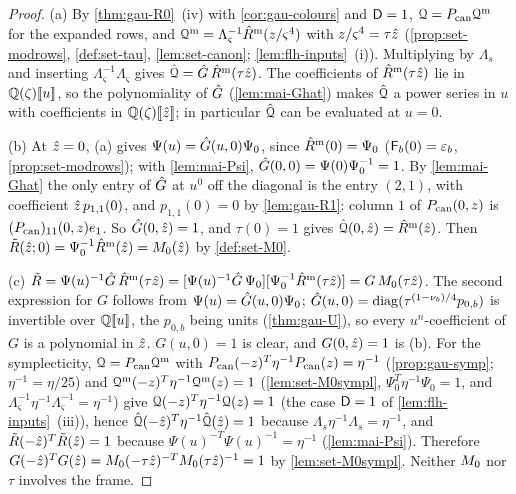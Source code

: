 \begin{proof}
(a) By \cref{thm:gau-R0}~(iv) with \cref{cor:gau-colours} and $\mathsf{D}=1$, $\mathcal{Q}=P_{\mathrm{can}}\mathcal{Q}^{\mathrm m}$ for the expanded rows, and $\mathcal{Q}^{\mathrm m}=\Lambda_\varsigma^{-1}\hat{R}^{\mathrm m}(z/\varsigma^4)$ with $z/\varsigma^4=\tau\hat{z}$ (\cref{prop:set-modrows}, \cref{def:set-tau}, \cref{lem:set-canon}; \cref{lem:flh-inputs}~(i)). Multiplying by $\Lambda_s$ and inserting $\Lambda_\varsigma^{-1}\Lambda_\varsigma$ gives $\hat{\mathcal{Q}}=\hat{G}\,\hat{R}^{\mathrm m}(\tau\hat{z})$. The coefficients of $\hat{R}^{\mathrm m}(\tau\hat{z})$ lie in $\mathbb{Q}(\zeta)[\![ u ]\!]$, so the polynomiality of $\hat{G}$ (\cref{lem:mai-Ghat}) makes $\hat{\mathcal{Q}}$ a power series in $u$ with coefficients in $\mathbb{Q}(\zeta)[\![ \hat{z} ]\!]$; in particular $\hat{\mathcal{Q}}$ can be evaluated at $u=0$.

(b) At $\hat{z}=0$, (a) gives $\Psi(u)=\hat{G}(u,0)\Psi_0$, since $\hat{R}^{\mathrm m}(0)=\Psi_0$ ($\mathsf{F}_b(0)=\varepsilon_b$, \cref{prop:set-modrows}); with \cref{lem:mai-Psi}, $\hat{G}(0,0)=\Psi(0)\Psi_0^{-1}=1$. By \cref{lem:mai-Ghat} the only entry of $\hat{G}$ at $u^0$ off the diagonal is the entry $(2,1)$, with coefficient $\hat{z}\,p_{1,1}(0)$, and $p_{1,1}(0)=0$ by \cref{lem:gau-R1}: column $1$ of $P_{\mathrm{can}}(0,z)$ is $(P_{\mathrm{can}})_{11}(0,z)e_1$. So $\hat{G}(0,\hat{z})=1$, and $\tau(0)=1$ gives $\hat{\mathcal{Q}}(0,\hat{z})=\hat{R}^{\mathrm m}(\hat{z})$. Then $\tilde R(\hat{z};0)=\Psi_0^{-1}\hat{R}^{\mathrm m}(\hat{z})=M_{0}(\hat{z})$ by \cref{def:set-M0}.

(c) $\tilde R=\Psi(u)^{-1}\hat{G}\,\hat{R}^{\mathrm m}(\tau\hat{z})=[\Psi(u)^{-1}\hat{G}\,\Psi_0][\Psi_0^{-1}\hat{R}^{\mathrm m}(\tau\hat{z})]=G\,M_{0}(\tau\hat{z})$. The second expression for $G$ follows from $\Psi(u)=\hat{G}(u,0)\Psi_0$; $\hat{G}(u,0)=\operatorname{diag}(\tau^{(1-\nu_b)/4}p_{0,b})$ is invertible over $\mathbb{Q}[\![ u ]\!]$, the $p_{0,b}$ being units (\cref{thm:gau-U}), so every $u^n$-coefficient of $G$ is a polynomial in $\hat{z}$. $G(u,0)=1$ is clear, and $G(0,\hat{z})=1$ is (b). For the symplecticity, $\mathcal{Q}=P_{\mathrm{can}}\mathcal{Q}^{\mathrm m}$ with $P_{\mathrm{can}}(-z)^T\eta^{-1}P_{\mathrm{can}}(z)=\eta^{-1}$ (\cref{prop:gau-symp}; $\eta^{-1}=\eta/25$) and $\mathcal{Q}^{\mathrm m}(-z)^T\eta^{-1}\mathcal{Q}^{\mathrm m}(z)=1$ (\cref{lem:set-M0sympl}, $\Psi_0^T\eta^{-1}\Psi_0=1$, and $\Lambda_\varsigma^{-1}\eta^{-1}\Lambda_\varsigma^{-1}=\eta^{-1}$) give $\mathcal{Q}(-z)^T\eta^{-1}\mathcal{Q}(z)=1$ (the case $\mathsf{D}=1$ of \cref{lem:flh-inputs}~(iii)), hence $\hat{\mathcal{Q}}(-\hat{z})^T\eta^{-1}\hat{\mathcal{Q}}(\hat{z})=1$ because $\Lambda_s\eta^{-1}\Lambda_s=\eta^{-1}$, and $\tilde R(-\hat{z})^T\tilde R(\hat{z})=1$ because $\Psi(u)^{-T}\Psi(u)^{-1}=\eta^{-1}$ (\cref{lem:mai-Psi}). Therefore $G(-\hat{z})^TG(\hat{z})=M_{0}(-\tau\hat{z})^{-T}M_{0}(\tau\hat{z})^{-1}=1$ by \cref{lem:set-M0sympl}. Neither $M_{0}$ nor $\tau$ involves the frame.
\end{proof}

